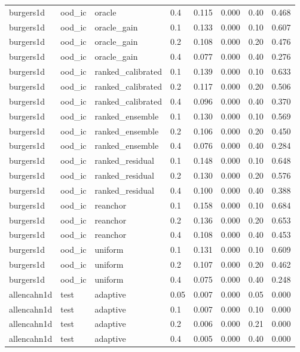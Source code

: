 \begin{tabular}{llllrrrr}
burgers1d & ood\_ic & oracle & 0.4 & 0.115 & 0.000 & 0.40 & 0.468 \\
burgers1d & ood\_ic & oracle\_gain & 0.1 & 0.133 & 0.000 & 0.10 & 0.607 \\
burgers1d & ood\_ic & oracle\_gain & 0.2 & 0.108 & 0.000 & 0.20 & 0.476 \\
burgers1d & ood\_ic & oracle\_gain & 0.4 & 0.077 & 0.000 & 0.40 & 0.276 \\
burgers1d & ood\_ic & ranked\_calibrated & 0.1 & 0.139 & 0.000 & 0.10 & 0.633 \\
burgers1d & ood\_ic & ranked\_calibrated & 0.2 & 0.117 & 0.000 & 0.20 & 0.506 \\
burgers1d & ood\_ic & ranked\_calibrated & 0.4 & 0.096 & 0.000 & 0.40 & 0.370 \\
burgers1d & ood\_ic & ranked\_ensemble & 0.1 & 0.130 & 0.000 & 0.10 & 0.569 \\
burgers1d & ood\_ic & ranked\_ensemble & 0.2 & 0.106 & 0.000 & 0.20 & 0.450 \\
burgers1d & ood\_ic & ranked\_ensemble & 0.4 & 0.076 & 0.000 & 0.40 & 0.284 \\
burgers1d & ood\_ic & ranked\_residual & 0.1 & 0.148 & 0.000 & 0.10 & 0.648 \\
burgers1d & ood\_ic & ranked\_residual & 0.2 & 0.130 & 0.000 & 0.20 & 0.576 \\
burgers1d & ood\_ic & ranked\_residual & 0.4 & 0.100 & 0.000 & 0.40 & 0.388 \\
burgers1d & ood\_ic & reanchor & 0.1 & 0.158 & 0.000 & 0.10 & 0.684 \\
burgers1d & ood\_ic & reanchor & 0.2 & 0.136 & 0.000 & 0.20 & 0.653 \\
burgers1d & ood\_ic & reanchor & 0.4 & 0.108 & 0.000 & 0.40 & 0.453 \\
burgers1d & ood\_ic & uniform & 0.1 & 0.131 & 0.000 & 0.10 & 0.609 \\
burgers1d & ood\_ic & uniform & 0.2 & 0.107 & 0.000 & 0.20 & 0.462 \\
burgers1d & ood\_ic & uniform & 0.4 & 0.075 & 0.000 & 0.40 & 0.248 \\
\midrule
allencahn1d & test & adaptive & 0.05 & 0.007 & 0.000 & 0.05 & 0.000 \\
allencahn1d & test & adaptive & 0.1 & 0.007 & 0.000 & 0.10 & 0.000 \\
allencahn1d & test & adaptive & 0.2 & 0.006 & 0.000 & 0.21 & 0.000 \\
allencahn1d & test & adaptive & 0.4 & 0.005 & 0.000 & 0.40 & 0.000 \\

\end{tabular}
